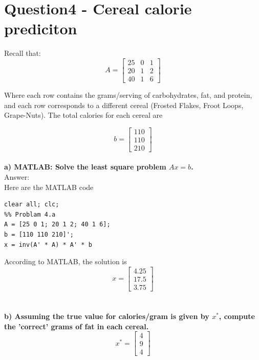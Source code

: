 \documentclass[paper=a4, fontsize=11pt]{scrartcl} %
\numberwithin{equation}{section} %
\numberwithin{figure}{section} %
\numberwithin{table}{section} %
\begin{document}
\section*{Question4 - Cereal calorie prediciton}

Recall that: 
$$
A = 
\begin{bmatrix}
25 & 0 & 1 \\
20 & 1 & 2 \\
40 & 1 & 6
\end{bmatrix}
$$

Where each row contains the grams/serving of carbohydrates, fat, and protein, and each row corresponds to a different cereal (Frosted Flakes, Froot Loops, Grape-Nuts). The total calories for each cereal are 

$$
b = 
\begin{bmatrix}
110 \\
110 \\
210 
\end{bmatrix}
$$\\

\textbf{a) MATLAB: Solve the least square problem $Ax = b$.} \\
Answer: \\
Here are the MATLAB code
\begin{lstlisting}
clear all; clc; 
%% Problam 4.a
A = [25 0 1; 20 1 2; 40 1 6];
b = [110 110 210]';
x = inv(A' * A) * A' * b

\end{lstlisting}

According to MATLAB, the solution is 
$$
x = 
\begin{bmatrix}
4.25 \\
17.5 \\ 
3.75
\end{bmatrix}
$$\\\\



\textbf{b) Assuming the true value for calories/gram is given by $x^*$, compute the 'correct' grams of fat in each cereal.} 
$$
x^* = 
\begin{bmatrix}
4 \\
9 \\ 
4
\end{bmatrix}
$$
\end{document}
